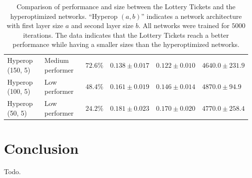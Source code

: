 \documentclass[12pt,final,twoside]{article}
\theoremstyle{plain}
\theoremstyle{definition}
\theoremstyle{remark}
\theoremstyle{named}
\begin{document}
\begin{table}[p]
{\begin{tabular}{llllll}
 Hyperop (150, 5) &  Medium performer &   $72.6\%$ &    $0.138 \pm 0.017$ &       $0.122 \pm 0.010$ &                   $4640.0 \pm 231.9$ \\
 Hyperop (100, 5) &  Low performer &   $48.4\%$ &    $0.161 \pm 0.019$ &       $0.146 \pm 0.014$ &                    $4870.0 \pm 94.9$ \\
 Hyperop (50, 5) &  Low performer &   $24.2\%$  &    $0.181 \pm 0.023$ &       $0.170 \pm 0.020$ &                   $4770.0 \pm 258.4$\\
\bottomrule
\end{tabular}
}
\caption{Comparison of performance and size between the Lottery Tickets and the hyperoptimized networks. ``Hyperop $(a, b)$'' indicates a network architecture with first layer size $a$ and second layer size $b$. All networks were trained for $5000$ iterations. The data indicates that the Lottery Tickets reach a better performance while having a smaller sizes than the hyperoptimized networks. }
\label{tab:lt-data}
\end{table}

\section{Conclusion}

Todo.

\newpage
    \printbibliography
\end{document}
